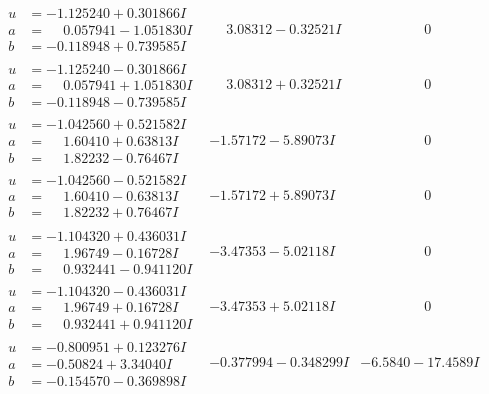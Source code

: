 \documentclass[1p]{elsarticle_modified}
\theoremstyle{definition}
\begin{document}
$$\begin{array}{c|c|c}
\begin{aligned}
u &= -1.125240 + 0.301866 I \\
a &= \phantom{-}0.057941 - 1.051830 I \\
b &= -0.118948 + 0.739585 I\end{aligned}
 & \phantom{-}3.08312 - 0.32521 I & \phantom{-0.000000 } 0 \\ \hline\begin{aligned}
u &= -1.125240 - 0.301866 I \\
a &= \phantom{-}0.057941 + 1.051830 I \\
b &= -0.118948 - 0.739585 I\end{aligned}
 & \phantom{-}3.08312 + 0.32521 I & \phantom{-0.000000 } 0 \\ \hline\begin{aligned}
u &= -1.042560 + 0.521582 I \\
a &= \phantom{-}1.60410 + 0.63813 I \\
b &= \phantom{-}1.82232 - 0.76467 I\end{aligned}
 & -1.57172 - 5.89073 I & \phantom{-0.000000 } 0 \\ \hline\begin{aligned}
u &= -1.042560 - 0.521582 I \\
a &= \phantom{-}1.60410 - 0.63813 I \\
b &= \phantom{-}1.82232 + 0.76467 I\end{aligned}
 & -1.57172 + 5.89073 I & \phantom{-0.000000 } 0 \\ \hline\begin{aligned}
u &= -1.104320 + 0.436031 I \\
a &= \phantom{-}1.96749 - 0.16728 I \\
b &= \phantom{-}0.932441 - 0.941120 I\end{aligned}
 & -3.47353 - 5.02118 I & \phantom{-0.000000 } 0 \\ \hline\begin{aligned}
u &= -1.104320 - 0.436031 I \\
a &= \phantom{-}1.96749 + 0.16728 I \\
b &= \phantom{-}0.932441 + 0.941120 I\end{aligned}
 & -3.47353 + 5.02118 I & \phantom{-0.000000 } 0 \\ \hline\begin{aligned}
u &= -0.800951 + 0.123276 I \\
a &= -0.50824 + 3.34040 I \\
b &= -0.154570 - 0.369898 I\end{aligned}
 & -0.377994 - 0.348299 I & -6.5840 - 17.4589 I\\

\end{array}$$
\end{document}
